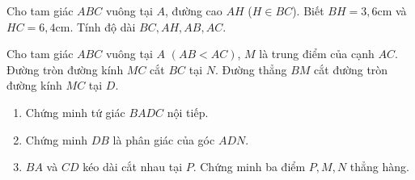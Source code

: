 \begin{ex}%
	Cho tam giác $ABC$ vuông tại $A$, đường cao $AH$ ($H \in BC$). Biết $BH = 3{,}6$cm và $HC = 6{,}4$cm. Tính độ dài $BC, AH, AB,AC$.
	\end{ex}
\begin{ex}%
	Cho tam giác $ABC$ vuông tại $A$ $(AB< AC)$, $M$ là trung điểm của cạnh $AC$. Đường tròn đường kính $MC$ cắt $BC$ tại $N$. Đường thẳng $BM$ cắt đường tròn đường kính $MC$ tại $D$.
	\begin{enumerate}
		\item Chứng minh tứ giác $BADC$ nội tiếp.
		\item Chứng minh $DB$ là phân giác của góc $ADN$.
		\item $BA$ và $CD$ kéo dài cắt nhau tại $P$. Chứng minh ba điểm $P,M,N$ thẳng hàng.
	\end{enumerate}
	\end{ex}

